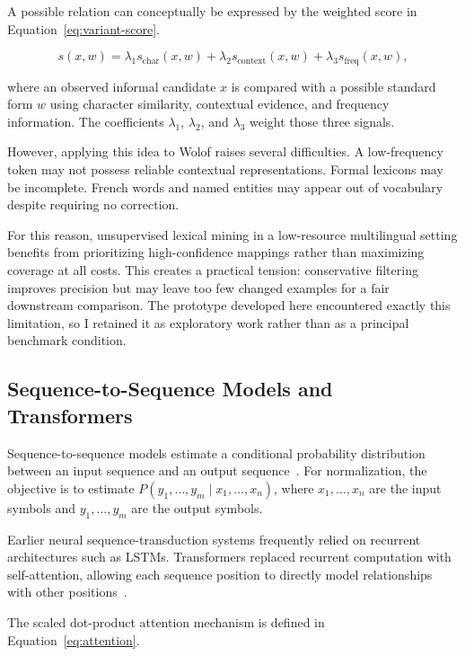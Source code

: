 \documentclass[12pt, a4paper, twoside, openany]{report}
\begin{document}
A possible relation can conceptually be expressed by the weighted score in Equation~\eqref{eq:variant-score}.

\begin{equation}
	s(x,w) =
	\lambda_1 s_{\text{char}}(x,w)
	+
	\lambda_2 s_{\text{context}}(x,w)
	+
	\lambda_3 s_{\text{freq}}(x,w),
	\label{eq:variant-score}
\end{equation}

where an observed informal candidate $x$ is compared with a possible standard form $w$ using character similarity, contextual evidence, and frequency information. The coefficients $\lambda_1$, $\lambda_2$, and $\lambda_3$ weight those three signals.

However, applying this idea to Wolof raises several difficulties. A low-frequency token may not possess reliable contextual representations. Formal lexicons may be incomplete. French words and named entities may appear out of vocabulary despite requiring no correction.

For this reason, unsupervised lexical mining in a low-resource multilingual setting benefits from prioritizing high-confidence mappings rather than maximizing coverage at all costs. This creates a practical tension: conservative filtering improves precision but may leave too few changed examples for a fair downstream comparison. The prototype developed here encountered exactly this limitation, so I retained it as exploratory work rather than as a principal benchmark condition.


\subsection{Sequence-to-Sequence Models and Transformers}

Sequence-to-sequence models estimate a conditional probability distribution between an input sequence and an output sequence~\cite{jurafsky2009slp}. For normalization, the objective is to estimate $P(y_1,\ldots,y_m \mid x_1,\ldots,x_n)$, where $x_1,\ldots,x_n$ are the input symbols and $y_1,\ldots,y_m$ are the output symbols.

Earlier neural sequence-transduction systems frequently relied on recurrent architectures such as \acp{LSTM}. Transformers replaced recurrent computation with self-attention, allowing each sequence position to directly model relationships with other positions~\cite{vaswani2017attention}.

The scaled dot-product attention mechanism is defined in Equation~\eqref{eq:attention}.
\end{document}
